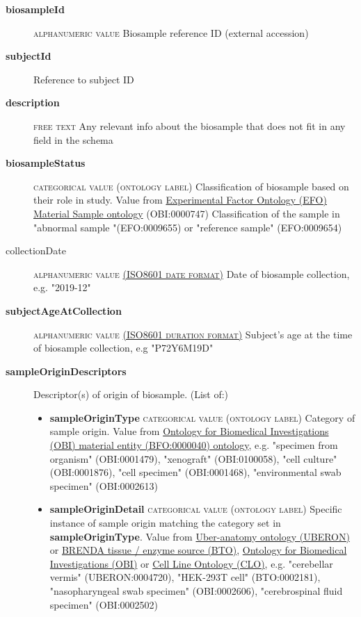 \documentclass[a4paper, 10pt]{article}        %
\begin{document}
  \begin{description}
	\item[\textbf{biosampleId}]  {\textsc{alphanumeric value}} Biosample reference ID (external accession)
	\item[\textbf{subjectId}] Reference to subject ID
	\item[\textbf{description}]  {\textsc{free text}} Any relevant info about the biosample that does not fit in any field in the schema
	\item[\textbf{biosampleStatus}] {\textsc{categorical value (ontology label)}} Classification of biosample based on their role in study. Value from  \href{https://www.ebi.ac.uk/ols/ontologies/efo/terms?iri=http%3A%2F%2Fpurl.obolibrary.org%2Fobo%2FOBI_0000747&viewMode=All&siblings=false}{Experimental Factor Ontology (EFO) Material Sample ontology} (OBI:0000747) Classification of the sample in "abnormal sample "(EFO:0009655) or "reference sample" (EFO:0009654)
	\item[collectionDate] {\textsc{alphanumeric value \href{https://www.iso.org/iso-8601-date-and-time-format.html}{(ISO8601 date format)}}} Date of biosample collection, e.g. "2019-12"
	\item[\textbf{subjectAgeAtCollection}] {\textsc{alphanumeric value \href{https://www.iso.org/iso-8601-date-and-time-format.html}{(ISO8601 duration format)}}} Subject's age at  the time of biosample collection, e.g "P72Y6M19D"
	\item[\textbf{sampleOriginDescriptors}] Descriptor(s) of origin of biosample. (List of:)
	\begin{itemize}
	\item[] \textbf{sampleOriginType} {\textsc{categorical value (ontology label)}} Category of sample origin. Value from \href{http://purl.obolibrary.org/obo/BFO_0000040}{Ontology for Biomedical Investigations (OBI) material entity (BFO:0000040) ontology}, e.g. "specimen from organism" (OBI:0001479), "xenograft" (OBI:0100058), "cell culture" (OBI:0001876), "cell specimen" (OBI:0001468), "environmental swab specimen" (OBI:0002613)
	\item[] \textbf{sampleOriginDetail} {\textsc{categorical value (ontology label)}} Specific instance of sample origin matching the category set in \textbf{sampleOriginType}. Value from \href{https://www.ebi.ac.uk/ols/ontologies/uberon}{Uber-anatomy ontology (UBERON)} or \href{https://www.ebi.ac.uk/ols/ontologies/bto}{BRENDA tissue / enzyme source (BTO)}, \href{http://purl.obolibrary.org/obo/BFO_0000040}{Ontology for Biomedical Investigations (OBI)} or \href{www.ebi.ac.uk/ols/ontologies/clo}{Cell Line Ontology (CLO)}, e.g. "cerebellar vermis" (UBERON:0004720), "HEK-293T cell" (BTO:0002181), "nasopharyngeal swab specimen" (OBI:0002606), "cerebrospinal fluid specimen" (OBI:0002502)

\end{itemize}
\end{description}
\end{document}
